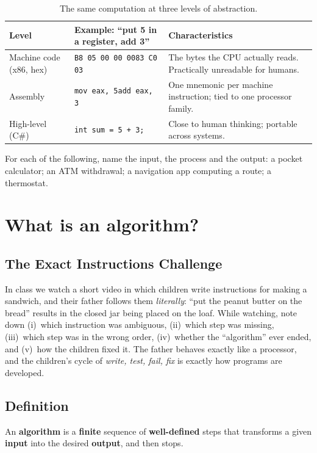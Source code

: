 \documentclass[11pt,a4paper]{article}
\begin{document}
\begin{table}[h]\centering\small
\begin{tabularx}{\linewidth}{lp{42mm}L}
\toprule
Level & Example: ``put 5 in a register, add 3'' & Characteristics\\ \midrule
Machine code (x86, hex) & \texttt{B8 05 00 00 00}\newline\texttt{83 C0 03} & The bytes the CPU actually reads. Practically unreadable for humans.\\
Assembly & \texttt{mov eax, 5}\newline\texttt{add eax, 3} & One mnemonic per machine instruction; tied to one processor family.\\
High-level (C\#) & \texttt{int sum = 5 + 3;} & Close to human thinking; portable across systems.\\ \bottomrule
\end{tabularx}
\caption{The same computation at three levels of abstraction.}
\end{table}

\begin{activity}
For each of the following, name the input, the process and the output: a pocket calculator; an ATM withdrawal; a navigation app computing a route; a thermostat.
\end{activity}

\section{What is an algorithm?}\label{sec:algorithm}

\subsection{The Exact Instructions Challenge}
In class we watch a short video in which children write instructions for making a sandwich, and their father follows them \emph{literally}: ``put the peanut butter on the bread'' results in the closed jar being placed on the loaf. While watching, note down (i)~which instruction was ambiguous, (ii)~which step was missing, (iii)~which step was in the wrong order, (iv)~whether the ``algorithm'' ever ended, and (v)~how the children fixed it. The father behaves exactly like a processor, and the children's cycle of \emph{write, test, fail, fix} is exactly how programs are developed.

\subsection{Definition}
\begin{defbox}
An \textbf{algorithm} is a \textcolor{amber}{\textbf{finite}} sequence of \textcolor{amber}{\textbf{well-defined}} steps that transforms a given \textcolor{amber}{\textbf{input}} into the desired \textcolor{amber}{\textbf{output}}, and then stops.
\end{defbox}
\end{document}
